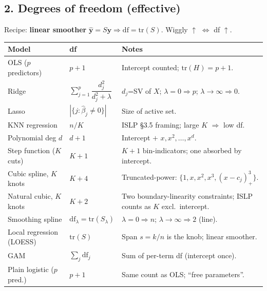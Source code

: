 \footnotesize


\subsection*{2. Degrees of freedom (effective)}

Recipe: \textbf{linear smoother} $\hat{\mathbf y}=S\mathbf y \Rightarrow \mathrm{df}=\mathrm{tr}(S)$. Wiggly $\uparrow$ $\Leftrightarrow$ df $\uparrow$.

\scriptsize
\begin{tabularx}{\linewidth}{@{}l l X@{}}
\toprule
\textbf{Model} & \textbf{df} & \textbf{Notes} \\
\midrule
OLS ($p$ predictors)    & $p+1$               & Intercept counted; $\mathrm{tr}(H)=p+1$. \\
Ridge                   & $\sum_{j=1}^p \dfrac{d_j^2}{d_j^2+\lambda}$ & $d_j$=SV of $X$; $\lambda{=}0\!\Rightarrow\!p$; $\lambda{\to}\infty\!\Rightarrow\!0$. \\
Lasso                   & $|\{j:\hat\beta_j\ne 0\}|$ & Size of active set. \\
KNN regression          & $n/K$               & ISLP \S3.5 framing; large $K$ $\Rightarrow$ low df. \\
Polynomial deg $d$      & $d+1$               & Intercept $+$ $x,x^2,\dots,x^d$. \\
Step function ($K$ cuts) & $K+1$              & $K{+}1$ bin-indicators; one absorbed by intercept. \\
Cubic spline, $K$ knots & $K+4$               & Truncated-power: $\{1,x,x^2,x^3,(x{-}c_j)^3_+\}$. \\
Natural cubic, $K$ knots & $K+2$              & Two boundary-linearity constraints; ISLP counts as $K$ excl.\ intercept. \\
Smoothing spline        & $\mathrm{df}_\lambda{=}\mathrm{tr}(S_\lambda)$ & $\lambda{=}0\!\Rightarrow\!n$; $\lambda{\to}\infty\!\Rightarrow\!2$ (line). \\
Local regression (LOESS) & $\mathrm{tr}(S)$         & Span $s{=}k/n$ is the knob; linear smoother. \\
GAM                     & $\sum_j \mathrm{df}_j$ & Sum of per-term df (intercept once). \\
Plain logistic ($p$ pred.) & $p+1$            & Same count as OLS; ``free parameters''. \\
\bottomrule
\end{tabularx}

